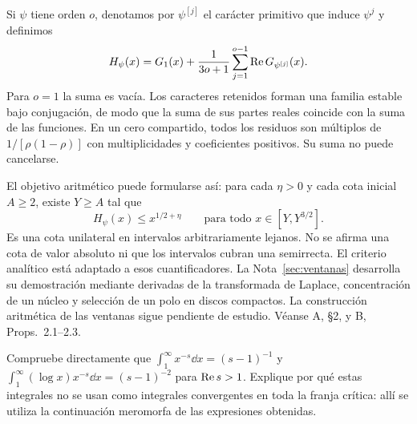 Si $\psi$ tiene orden $o$, denotamos por $\psi^{[j]}$ el carácter primitivo
que induce $\psi^j$ y definimos
\begin{equation}
 H_\psi(x)=G_1(x)+\frac1{3o+1}
    \sum_{j=1}^{o-1}\operatorname{Re} G_{\psi^{[j]}}(x).
 \label{eq:hpsi}
\end{equation}
Para $o=1$ la suma es vacía. Los caracteres retenidos forman una familia
estable bajo conjugación, de modo que la suma de sus partes reales coincide
con la suma de las funciones. En un cero compartido, todos los residuos
son múltiplos de $1/[\rho(1-\rho)]$ con multiplicidades y coeficientes
positivos. Su suma no puede cancelarse.

El objetivo aritmético puede formularse así: para cada $\eta>0$ y cada
cota inicial $A\ge2$, existe $Y\ge A$ tal que
\begin{equation}
 H_\psi(x)\le x^{1/2+\eta}
 \qquad\text{para todo }x\in[Y,Y^{3/2}].
 \label{eq:ventana}
\end{equation}
Es una cota unilateral en intervalos arbitrariamente lejanos. No se afirma
una cota de valor absoluto ni que los intervalos cubran una semirrecta.
El criterio analítico está adaptado a esos cuantificadores. La
Nota~\ref{sec:ventanas} desarrolla su demostración mediante derivadas de
la transformada de Laplace, concentración de un núcleo y selección de
un polo en discos compactos. La construcción aritmética de las ventanas
sigue pendiente de estudio. Véanse A, §2, y B, Props.~2.1--2.3.

\begin{ejercicio}
Compruebe directamente que
$\int_1^\infty x^{-s}\dd x=(s-1)^{-1}$ y
$\int_1^\infty(\log x)x^{-s}\dd x=(s-1)^{-2}$ para $\operatorname{Re} s>1$.
Explique por qué estas integrales no se usan como integrales convergentes
en toda la franja crítica: allí se utiliza la continuación meromorfa de
las expresiones obtenidas.
\end{ejercicio}
